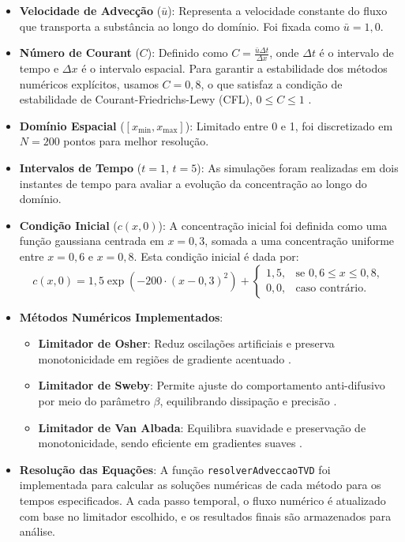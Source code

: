 \documentclass{article}
\begin{document}
\begin{itemize}
    \item \textbf{Velocidade de Advecção} (\( \bar{u} \)): Representa a velocidade constante do fluxo que transporta a substância ao longo do domínio. Foi fixada como \(\bar{u} = 1,0\).
    \item \textbf{Número de Courant} (\(C\)): Definido como \(C = \frac{\bar{u} \Delta t}{\Delta x}\), onde \(\Delta t\) é o intervalo de tempo e \(\Delta x\) é o intervalo espacial. Para garantir a estabilidade dos métodos numéricos explícitos, usamos \(C = 0,8\), o que satisfaz a condição de estabilidade de Courant-Friedrichs-Lewy (CFL), \(0 \leq C \leq 1\) \cite{leveque2002finite, harten1983high}.
    \item \textbf{Domínio Espacial} (\([x_{\text{min}}, x_{\text{max}}]\)): Limitado entre 0 e 1, foi discretizado em \(N = 200\) pontos para melhor resolução.
    \item \textbf{Intervalos de Tempo} (\(t=1\), \(t=5\)): As simulações foram realizadas em dois instantes de tempo para avaliar a evolução da concentração ao longo do domínio.
    \item \textbf{Condição Inicial} (\(c(x, 0)\)): A concentração inicial foi definida como uma função gaussiana centrada em \(x = 0,3\), somada a uma concentração uniforme entre \(x = 0,6\) e \(x = 0,8\). Esta condição inicial é dada por:
          \begin{equation}
              c(x, 0) = 1,5 \exp(-200 \cdot (x - 0,3)^2) +
              \begin{cases}
                  1,5, & \text{se } 0,6 \leq x \leq 0,8, \\
                  0,0, & \text{caso contrário}.
              \end{cases}
          \end{equation}
    \item \textbf{Métodos Numéricos Implementados}:
          \begin{itemize}
              \item \textbf{Limitador de Osher}: Reduz oscilações artificiais e preserva monotonicidade em regiões de gradiente acentuado \cite{osher1984rktvd}.
              \item \textbf{Limitador de Sweby}: Permite ajuste do comportamento anti-difusivo por meio do parâmetro \(\beta\), equilibrando dissipação e precisão \cite{sweby1984high}.
              \item \textbf{Limitador de Van Albada}: Equilibra suavidade e preservação de monotonicidade, sendo eficiente em gradientes suaves \cite{vanalbada1982family}.
          \end{itemize}
    \item \textbf{Resolução das Equações}: A função \texttt{resolverAdveccaoTVD} foi implementada para calcular as soluções numéricas de cada método para os tempos especificados. A cada passo temporal, o fluxo numérico é atualizado com base no limitador escolhido, e os resultados finais são armazenados para análise.
\end{itemize}
\end{document}

